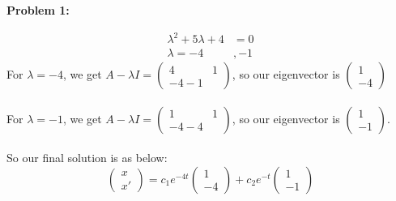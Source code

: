 \documentclass[11pt]{article}
\newenvironment{problem}[1]{\textbf{Problem #1: }}{\newpage}
\begin{document}
\begin{problem}{1}
\begin{enumerate}[label = (\alph*)]
\begin{align*}
				\lambda^2 + 5\lambda + 4 &= 0 \\
				\lambda = -4&,-1
			\end{align*}
			For $\lambda = -4$, we get $A - \lambda I = \begin{pmatrix}
				4 & 1 \\
				-4 -1 
			\end{pmatrix}$, so our eigenvector is $\begin{pmatrix}
				1 \\
				-4
			\end{pmatrix}$
			\\ \\
			For $\lambda = -1$, we get $A - \lambda I = \begin{pmatrix}
			1 & 1 \\
			-4 -4 
			\end{pmatrix}$, so our eigenvector is $\begin{pmatrix}
			1 \\
			-1
			\end{pmatrix}$.
			\\ \\
			So our final solution is as below:
			\[\begin{pmatrix}
				x \\
				x'
			\end{pmatrix} = 
			c_1 e^{-4t}\begin{pmatrix}
				1 \\ -4
			\end{pmatrix} + c_2e^{-t}\begin{pmatrix}
				1 \\ -1
			\end{pmatrix}\]
		\end{enumerate}
	\end{problem}
	
\end{document}
